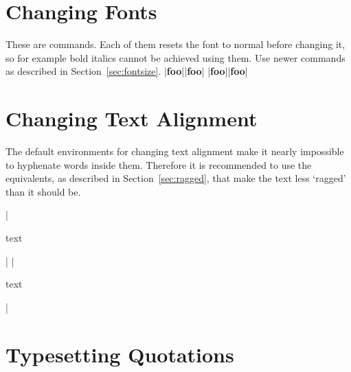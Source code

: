 \section{Changing Fonts}

These are  commands. Each of them resets the font to normal
before changing it, so for example bold italics cannot be achieved using them.
Use newer commands as described in Section~\ref{sec:fontsize}.
\chto|{\bf foo}||\textbf{foo}|
\chto|{\bf foo}||{\bfseries foo}|

\section{Changing Text Alignment}

The default  environments for changing text alignment make it
nearly impossible to hyphenate words inside them. Therefore it is recommended
to use the  equivalents, as described in
Section~\ref{sec:ragged}, that make the text less \enquote*{ragged} than it
should be.
\begin{chktexignore}  
\chto|\begin{center}
  text
\end{center}|
|\usepackage{ragged2e}
\begin{Center}
  text
\end{Center}|
\end{chktexignore}

\section{Typesetting Quotations}

